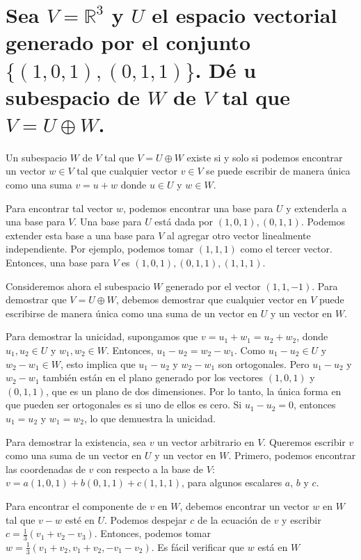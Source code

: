 \section{Sea $V = \mathbb{R}^3$ y $U$ el espacio vectorial generado por el conjunto $\{ (1,0,1) , (0,1,1) \}$. Dé u subespacio de $W$ de $V$ tal que $V=U \oplus W$.}

Un subespacio $W$ de $V$ tal que $V=U \oplus W$ existe si y solo si podemos encontrar un vector $w \in V$ tal que cualquier vector $v \in V$ se puede escribir de manera única como una suma $v = u + w$ donde $u \in U$ y $w \in W$.

Para encontrar tal vector $w$, podemos encontrar una base para $U$ y extenderla a una base para $V$. Una base para $U$ está dada por ${(1,0,1), (0,1,1)}$. Podemos extender esta base a una base para $V$ al agregar otro vector linealmente independiente. Por ejemplo, podemos tomar $(1,1,1)$ como el tercer vector. Entonces, una base para $V$ es ${(1,0,1), (0,1,1), (1,1,1)}$.

Consideremos ahora el subespacio $W$ generado por el vector $(1,1,-1)$. Para demostrar que $V=U \oplus W$, debemos demostrar que cualquier vector en $V$ puede escribirse de manera única como una suma de un vector en $U$ y un vector en $W$.

Para demostrar la unicidad, supongamos que $v = u_1 + w_1 = u_2 + w_2$, donde $u_1, u_2 \in U$ y $w_1, w_2 \in W$. Entonces, $u_1 - u_2 = w_2 - w_1$. Como $u_1 - u_2 \in U$ y $w_2 - w_1 \in W$, esto implica que $u_1 - u_2$ y $w_2 - w_1$ son ortogonales. Pero $u_1 - u_2$ y $w_2 - w_1$ también están en el plano generado por los vectores $(1,0,1)$ y $(0,1,1)$, que es un plano de dos dimensiones. Por lo tanto, la única forma en que pueden ser ortogonales es si uno de ellos es cero. Si $u_1 - u_2 = 0$, entonces $u_1 = u_2$ y $w_1 = w_2$, lo que demuestra la unicidad.

Para demostrar la existencia, sea $v$ un vector arbitrario en $V$. Queremos escribir $v$ como una suma de un vector en $U$ y un vector en $W$. Primero, podemos encontrar las coordenadas de $v$ con respecto a la base de $V$: $v = a(1,0,1) + b(0,1,1) + c(1,1,1)$, para algunos escalares $a$, $b$ y $c$.

Para encontrar el componente de $v$ en $W$, debemos encontrar un vector $w$ en $W$ tal que $v - w$ esté en $U$. Podemos despejar $c$ de la ecuación de $v$ y escribir $c = \frac{1}{3}(v_1 + v_2 - v_3)$. Entonces, podemos tomar $w = \frac{1}{3}(v_1 + v_2, v_1 + v_2, -v_1 - v_2)$. Es fácil verificar que $w$ está en $W$


